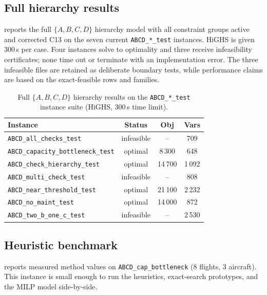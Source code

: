 \subsection{Full hierarchy results}

 reports the full $\{A,B,C,D\}$ hierarchy model with all
constraint groups active and corrected C13 on the seven current
\texttt{ABCD\_*\_test} instances.  HiGHS is given 300\,s per case.  Four
instances solve to optimality and three receive infeasibility certificates;
none time out or terminate with an implementation error.  The three
infeasible files are retained as deliberate boundary tests, while performance
claims are based on the exact-feasible rows and families.

\begin{table}[t]
\centering\small
\caption{Full $\{A,B,C,D\}$ hierarchy results on the \texttt{ABCD\_*\_test}
  instance suite (HiGHS, 300\,s time limit).}
\label{tab:hierarchy}
\begin{tabular}{lccc}
\toprule
Instance & Status & Obj & Vars \\
\midrule
\texttt{ABCD\_all\_checks\_test} & infeasible & -- & 709 \\
\texttt{ABCD\_capacity\_bottleneck\_test} & optimal & 8\,300 & 648 \\
\texttt{ABCD\_check\_hierarchy\_test} & optimal & 14\,700 & 1\,092 \\
\texttt{ABCD\_multi\_check\_test} & infeasible & -- & 808 \\
\texttt{ABCD\_near\_threshold\_test} & optimal & 21\,100 & 2\,232 \\
\texttt{ABCD\_no\_maint\_test} & optimal & 14\,000 & 872 \\
\texttt{ABCD\_two\_b\_one\_c\_test} & infeasible & -- & 2\,530 \\
\bottomrule
\end{tabular}
\end{table}

\subsection{Heuristic benchmark}

 reports measured method values on
\texttt{ABCD\_cap\_bottleneck} (8 flights, 3 aircraft).
This instance is small enough to run the heuristics, exact-search
prototypes, and the MILP model side-by-side.

